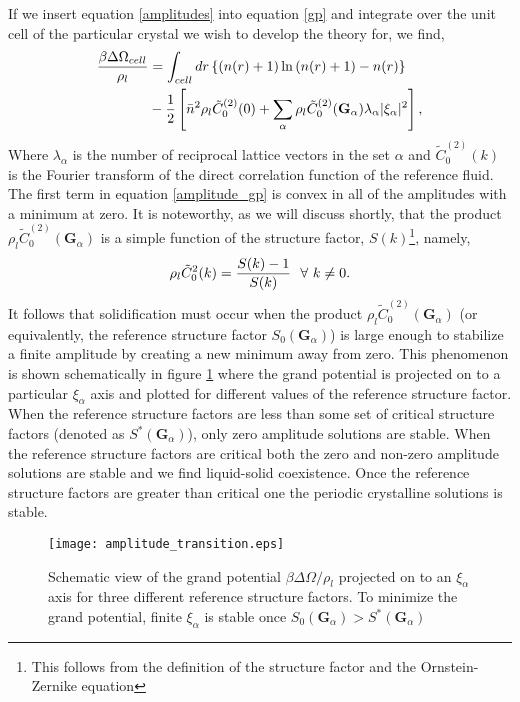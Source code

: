If we insert equation \ref{amplitudes} into equation \ref{gp} and integrate
over the unit cell of the particular crystal we wish to develop the theory for,
we find,
%
\begin{align}
    \label{amplitude_gp} 
    \frac{\beta \Delta\Omega_{cell}}{\rho_l} &=  \int_{cell} 
        dr \left\lbrace (n(r) + 1)\ln\left(n(r) + 1\right) - n(r) \right\rbrace \nonumber \\
    &- \frac{1}{2} \left[\bar{n} ^ 2 \rho_l\tilde{C}^{(2)}_0(0) + \sum_\alpha\rho_l\tilde{C}^{(2)}_0
            (\mathbf{G}_\alpha) \lambda_\alpha\vert\xi_\alpha\vert^2\right],
\end{align}
%
Where $\lambda_\alpha$ is the number of reciprocal lattice vectors in the set
$\alpha$ and $\tilde{C}^{(2)}_0(k)$ is the Fourier transform of the direct
correlation function of the reference fluid. The first term in equation
\ref{amplitude_gp} is convex in all of the amplitudes with a minimum at zero.
It is noteworthy, as we will discuss shortly, that the product $\rho_l
\tilde{C}^{(2)}_0(\mathbf{G}_\alpha)$ is a simple function of the structure
factor, $S(k)$\footnote{This follows from the definition of the structure
factor and the Ornstein-Zernike equation}, namely,
%
\begin{equation}
    \rho_l \tilde{C}_0^2(k) = \frac{S(k) - 1}{S(k)}\,\,\,\,\forall \,\,k \ne 0.
\end{equation}
%
It follows that solidification must occur when the product $\rho_l
\tilde{C}^{(2)}_0(\mathbf{G}_\alpha)$ (or equivalently, the reference structure
factor $S_0(\mathbf{G}_\alpha)$) is large enough to stabilize a finite
amplitude by creating a new minimum away from zero.  This phenomenon is shown
schematically in figure \ref{fig:amplitude_transition} where the grand
potential is projected on to a particular $\xi_\alpha$ axis and plotted for
different values of the reference structure factor. When the reference
structure factors are less than some set of critical structure factors 
(denoted as $S^*(\mathbf{G}_\alpha)$), only zero amplitude solutions are
stable.  When the reference structure factors are critical both the zero and
non-zero amplitude solutions are stable and we find liquid-solid coexistence.
Once the reference structure factors are greater than critical one the periodic
crystalline solutions is stable.
%
\begin{figure}
    \centering
    \texttt{[image: amplitude\_transition.eps]}
    \caption[Grand Potential through the Solidification transition]{ 
        Schematic view of the grand potential $\beta\Delta\Omega / \rho_l$
        projected on to an $\xi_\alpha$ axis for three different reference
        structure factors. To minimize the grand potential, finite $\xi_\alpha$
        is stable once $S_0(\mathbf{G}_\alpha) > S^*(\mathbf{G}_\alpha)$
    }\label{fig:amplitude_transition}
\end{figure}
